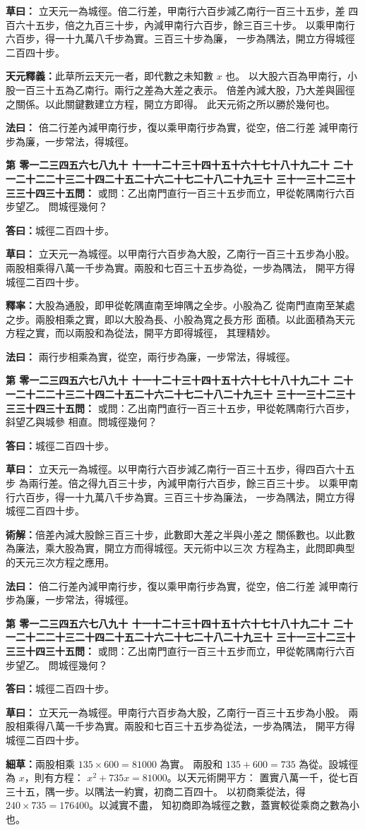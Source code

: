 \documentclass[11pt,a4paper]{article}
\newcounter{probnum}
\newcommand{\chnum}[1]{%
  \ifcase#1 零\or 一\or 二\or 三\or 四\or 五\or 六\or 七\or 八\or 九\or 十\or
    十一\or 十二\or 十三\or 十四\or 十五\or 十六\or 十七\or 十八\or 十九\or 二十\or
    二十一\or 二十二\or 二十三\or 二十四\or 二十五\or 二十六\or 二十七\or 二十八\or 二十九\or 三十\or
    三十一\or 三十二\or 三十三\or 三十四\or 三十五\fi}
\newcommand{\problem}[1]{\stepcounter{probnum}\par\noindent\textbf{第\chnum{\value{probnum}}問：}#1\par\vspace{0.2cm}}
\newcommand{\answer}[1]{\par\noindent\textbf{答曰：}#1\par\vspace{0.2cm}}
\newcommand{\working}[1]{\par\noindent\textbf{草曰：}#1\par\vspace{0.2cm}}
\newcommand{\method}[1]{\par\noindent\textbf{法曰：}#1\par\vspace{0.3cm}}
\begin{document}
\working{
立天元一為城徑。倍二行差，甲南行六百步減乙南行一百三十五步，差
四百六十五步，倍之九百三十步，內減甲南行六百步，餘三百三十步。
以乘甲南行六百步，得一十九萬八千步為實。三百三十步為廉，
一步為隅法，開立方得城徑二百四十步。

\textbf{天元釋義：}此草所云天元一者，即代數之未知數 $x$ 也。
以大股六百為甲南行，小股一百三十五為乙南行。兩行之差為大差之表示。
倍差內減大股，乃大差與圓徑之關係。以此關鍵數建立方程，開立方即得。
此天元術之所以勝於幾何也。
}

\method{
倍二行差內減甲南行步，復以乘甲南行步為實，從空，倍二行差
減甲南行步為廉，一步常法，得城徑。
}

\problem{
或問：乙出南門直行一百三十五步而立，甲從乾隅南行六百步望乙。
問城徑幾何？
}

\answer{城徑二百四十步。}

\working{
立天元一為城徑。以甲南行六百步為大股，乙南行一百三十五步為小股。
兩股相乘得八萬一千步為實。兩股和七百三十五步為從，一步為隅法，
開平方得城徑二百四十步。

\textbf{釋率：}大股為通股，即甲從乾隅直南至坤隅之全步。小股為乙
從南門直南至某處之步。兩股相乘之實，即以大股為長、小股為寬之長方形
面積。以此面積為天元方程之實，而以兩股和為從法，開平方即得城徑，
其理精妙。
}

\method{
兩行步相乘為實，從空，兩行步為廉，一步常法，得城徑。
}

\problem{
或問：乙出南門直行一百三十五步，甲從乾隅南行六百步，斜望乙與城參
相直。問城徑幾何？
}

\answer{城徑二百四十步。}

\working{
立天元一為城徑。以甲南行六百步減乙南行一百三十五步，得四百六十五步
為兩行差。倍之得九百三十步，內減甲南行六百步，餘三百三十步。
以乘甲南行六百步，得一十九萬八千步為實。三百三十步為廉法，
一步為隅法，開立方得城徑二百四十步。

\textbf{術解：}倍差內減大股餘三百三十步，此數即大差之半與小差之
關係數也。以此數為廉法，乘大股為實，開立方而得城徑。天元術中以三次
方程為主，此問即典型的天元三次方程之應用。
}

\method{
倍二行差內減甲南行步，復以乘甲南行步為實，從空，倍二行差
減甲南行步為廉，一步常法，得城徑。
}

\problem{
或問：乙出南門直行一百三十五步而立，甲從乾隅南行六百步望乙。
問城徑幾何？
}

\answer{城徑二百四十步。}

\working{
立天元一為城徑。甲南行六百步為大股，乙南行一百三十五步為小股。
兩股相乘得八萬一千步為實。兩股和七百三十五步為從法，一步為隅法，
開平方得城徑二百四十步。

\textbf{細草：}兩股相乘 $135 \times 600 = 81000$ 為實。
兩股和 $135 + 600 = 735$ 為從。設城徑為 $x$，則有方程：
$x^2 + 735x = 81000$。以天元術開平方：
置實八萬一千，從七百三十五，隅一步。以隅法一約實，初商二百四十。
以初商乘從法，得 $240 \times 735 = 176400$。以減實不盡，
知初商即為城徑之數，蓋實較從乘商之數為小也。
}
\end{document}
